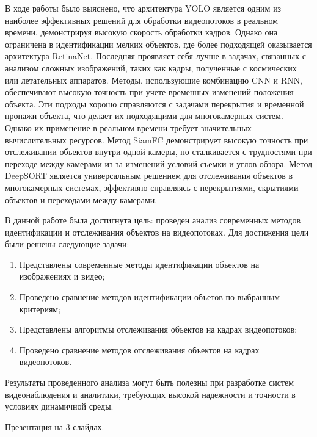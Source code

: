 В ходе работы было выяснено, что архитектура YOLO является одним из наиболее эффективных решений для обработки видеопотоков в реальном времени, демонстрируя высокую скорость обработки кадров. Однако она ограничена в идентификации мелких объектов, где более подходящей оказывается архитектура RetinaNet. Последняя проявляет себя лучше в задачах, связанных с анализом сложных изображений, таких как кадры, полученные с космических или летательных аппаратов.
Методы, использующие комбинацию CNN и RNN, обеспечивают высокую точность при учете временных изменений положения объекта. Эти подходы хорошо справляются с задачами перекрытия и временной пропажи объекта, что делает их подходящими для многокамерных систем. Однако их применение в реальном времени требует значительных вычислительных ресурсов. Метод SiamFC демонстрирует высокую точность при отслеживании объектов внутри одной камеры, но сталкивается с трудностями при переходе между камерами из-за изменений условий съемки и углов обзора. Метод DeepSORT является универсальным решением для отслеживания объектов в многокамерных системах, эффективно справляясь с перекрытиями, скрытиями объектов и переходами между камерами.

В данной работе была достигнута цель: проведен анализ современных методов идентификации и отслеживания объектов на видеопотоках. Для достижения цели были решены следующие задачи:
\begin{enumerate}
    \item Представлены современные методы идентификации объектов на изображениях и видео;
    \item Проведено сравнение методов идентификации объетов по выбранным критериям;
    \item Представлены алгоритмы отслеживания объектов на кадрах видеопотоков;
    \item Проведено сравнение методов отслеживания объектов на кадрах видеопотоков.
\end{enumerate}

Результаты проведенного анализа могут быть полезны при разработке систем видеонаблюдения и аналитики, требующих высокой надежности и точности в условиях динамичной среды.


\titleformat{\chapter}[block]
  {\normalfont\Large\bfseries\centering}{\thechapter}{1em}{}
\renewcommand\bibname{\centering СПИСОК ИСПОЛЬЗОВАННЫХ ИСТОЧНИКОВ}



Презентация на 3 слайдах.



